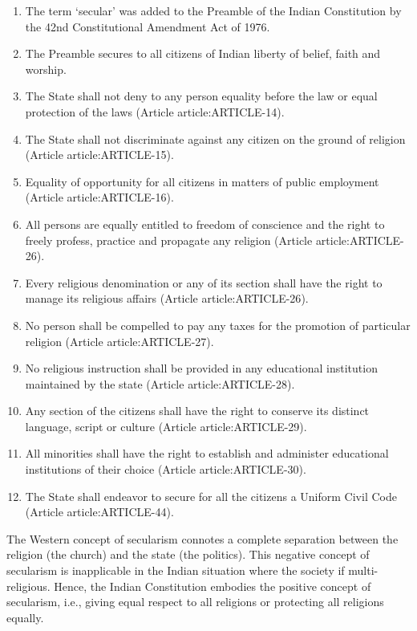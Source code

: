\begin{multicols}{2}
\renewcommand{\labelenumi}{\textbf{(\alph{enumi})}}
\begin{enumerate}
  \item The term `secular' was added to the Preamble of the Indian Constitution by the 42nd Constitutional Amendment Act of 1976.
  \item The Preamble secures to all citizens of Indian liberty of belief, faith and worship.
  \item The State shall not deny to any person equality before the law or equal protection of the laws (Article \gls{article:ARTICLE-14}).
  \item The State shall not discriminate against any citizen on the ground of religion (Article \gls{article:ARTICLE-15}).
  \item Equality of opportunity for all citizens in matters of public employment (Article \gls{article:ARTICLE-16}).
  \item All persons are equally entitled to freedom of conscience and the right to freely profess, practice and propagate any religion (Article \gls{article:ARTICLE-26}).
  \item Every religious denomination or any of its section shall have the right to manage its religious affairs (Article \gls{article:ARTICLE-26}).
  \item No person shall be compelled to pay any taxes for the promotion of particular religion (Article \gls{article:ARTICLE-27}).
  \item No religious instruction shall be provided in any educational institution maintained by the state (Article \gls{article:ARTICLE-28}).
  \item Any section of the citizens shall have the right to conserve its distinct language, script or culture (Article \gls{article:ARTICLE-29}).
  \item All minorities shall have the right to establish and administer educational institutions of their choice (Article \gls{article:ARTICLE-30}).
  \item The State shall endeavor to secure for all the citizens a Uniform Civil Code (Article \gls{article:ARTICLE-44}).
\end{enumerate}

The Western concept of secularism connotes a complete separation between the religion (the church) and the state (the politics). This negative concept of secularism is inapplicable in the Indian situation where the society if multi-religious. Hence, the Indian Constitution embodies the positive concept of secularism, i.e., giving equal respect to all religions or protecting all religions equally.


\end{multicols}
